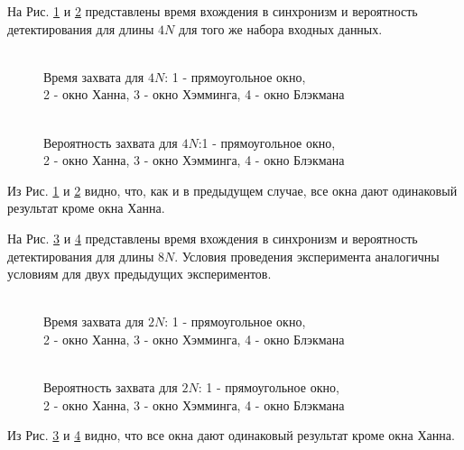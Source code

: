 На Рис. \ref{pic:dma5mhz_4fft_lockTime} и \ref{pic:dma5mhz_4fft_probDetection} представлены время вхождения в синхронизм и вероятность детектирования для длины ${4N}$
для того же набора входных данных.
\begin{figure}[h]
\center{}
	\caption{\\Время захвата для ${4N}$: 1 - прямоугольное окно,\\2 - окно Ханна, 3 - окно Хэмминга, 4 - окно Блэкмана}
	\label{pic:dma5mhz_4fft_lockTime}
\end{figure}
\begin{figure}[h]
\center{}
	\caption{\\Вероятность захвата для ${4N}$:1 - прямоугольное окно,\\2 - окно Ханна, 3 - окно Хэмминга, 4 - окно Блэкмана}
	\label{pic:dma5mhz_4fft_probDetection}
\end{figure}
Из Рис. \ref{pic:dma5mhz_4fft_lockTime} и \ref{pic:dma5mhz_4fft_probDetection} видно, что, как и в предыдущем случае, все окна дают одинаковый результат кроме окна Ханна.

На Рис. \ref{pic:dma5mhz_8fft_lockTime} и \ref{pic:dma5mhz_8fft_probDetection} представлены время вхождения в синхронизм и вероятность детектирования для длины ${8N}$. Условия
проведения эксперимента аналогичны условиям для двух предыдущих экспериментов.
\begin{figure}[h]
\center{}
	\caption{\\Время захвата для ${2N}$: 1 - прямоугольное окно,\\2 - окно Ханна, 3 - окно Хэмминга, 4 - окно Блэкмана}
	\label{pic:dma5mhz_8fft_lockTime}
\end{figure}
\begin{figure}[h]
\center{}
	\caption{\\Вероятность захвата для ${2N}$: 1 - прямоугольное окно,\\2 - окно Ханна, 3 - окно Хэмминга, 4 - окно Блэкмана}
	\label{pic:dma5mhz_8fft_probDetection}
\end{figure}
Из Рис. \ref{pic:dma5mhz_8fft_lockTime} и \ref{pic:dma5mhz_8fft_probDetection} видно, что все окна дают одинаковый результат кроме окна Ханна.

